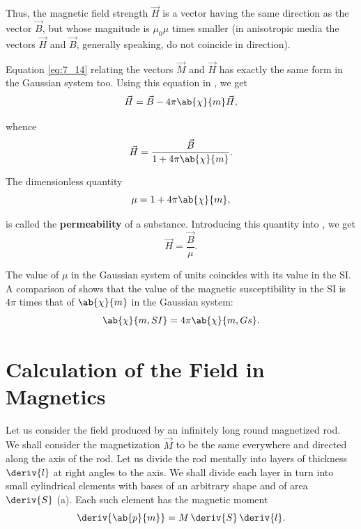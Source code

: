 \noindent
Thus, the magnetic field strength $\vec{H}$ is a vector having the same direction as the vector $\vec{B}$, but whose magnitude is $\mu_0\mu$ times smaller (in anisotropic media the vectors $\vec{H}$ and $\vec{B}$, generally speaking, do not coincide in direction).

Equation \eqref{eq:7_14} relating the vectors $\vec{M}$ and $\vec{H}$ has exactly the same form in the Gaussian system too.
Using this equation in , we get
\begin{equation*}
    \vec{H} = \vec{B} - 4\pi\ab{\chi}{m} \vec{H},
\end{equation*}

\noindent
whence
\begin{equation}\label{eq:7_18}
    \vec{H} = \frac{\vec{B}}{1 + 4\pi\ab{\chi}{m}}.
\end{equation}

The dimensionless quantity
\begin{equation}\label{eq:7_19}
    \mu = 1 + 4\pi\ab{\chi}{m},
\end{equation}

\noindent
is called the \textbf{permeability} of a substance.
Introducing this quantity into , we get
\begin{equation}\label{eq:7_20}
    \vec{H} = \frac{\vec{B}}{\mu}.
\end{equation}

The value of $\mu$ in the Gaussian system of units coincides with its value in the SI.
A comparison of  shows that the value of the magnetic susceptibility in the SI is $4\pi$ times that of $\ab{\chi}{m}$ in the Gaussian system:
\begin{equation}\label{eq:7_21}
    \ab{\chi}{m,SI} = 4\pi\ab{\chi}{m,Gs}.
\end{equation}

\section{Calculation of the Field in Magnetics}\label{sec:7_3}

Let us consider the field produced by an infinitely long round magnetized rod. We shall consider the magnetization $\vec{M}$ to be the same everywhere and directed along the axis of the rod.
Let us divide the rod mentally into layers of thickness $\deriv{l}$ at right angles to the axis.
We shall divide each layer in turn into small cylindrical elements with bases of an arbitrary shape and of area $\deriv{S}$ (a).
Each such element has the magnetic moment
\begin{equation}\label{eq:7_22}
    \deriv{\ab{p}{m}} = M\, \deriv{S}\, \deriv{l}.
\end{equation}

